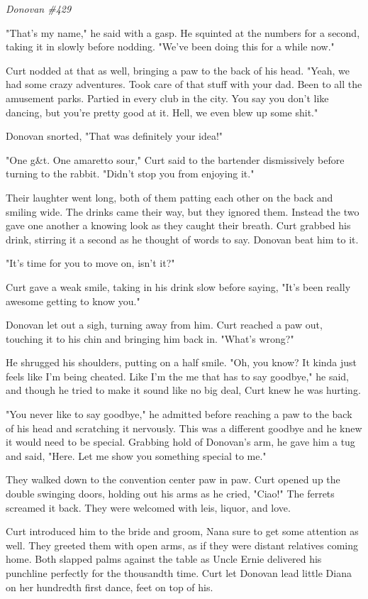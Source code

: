 \emph{Donovan \#429}

"That's my name," he said with a gasp. He squinted at the numbers for a second, taking it in slowly before nodding. "We've been doing this for a while now."

Curt nodded at that as well, bringing a paw to the back of his head. "Yeah, we had some crazy adventures. Took care of that stuff with your dad. Been to all the amusement parks. Partied in every club in the city. You say you don't like dancing, but you're pretty good at it. Hell, we even blew up some shit."

Donovan snorted, "That was definitely your idea!"

"One g\&t. One amaretto sour," Curt said to the bartender dismissively before turning to the rabbit. "Didn't stop you from enjoying it."

Their laughter went long, both of them patting each other on the back and smiling wide. The drinks came their way, but they ignored them. Instead the two gave one another a knowing look as they caught their breath. Curt grabbed his drink, stirring it a second as he thought of words to say. Donovan beat him to it.

"It's time for you to move on, isn't it?"

Curt gave a weak smile, taking in his drink slow before saying, "It's been really awesome getting to know you."

Donovan let out a sigh, turning away from him. Curt reached a paw out, touching it to his chin and bringing him back in. "What's wrong?"

He shrugged his shoulders, putting on a half smile. "Oh, you know? It kinda just feels like I'm being cheated. Like I'm the me that has to say goodbye," he said, and though he tried to make it sound like no big deal, Curt knew he was hurting.

"You never like to say goodbye," he admitted before reaching a paw to the back of his head and scratching it nervously. This was a different goodbye and he knew it would need to be special. Grabbing hold of Donovan's arm, he gave him a tug and said, "Here. Let me show you something special to me."

They walked down to the convention center paw in paw. Curt opened up the double swinging doors, holding out his arms as he cried, "Ciao!" The ferrets screamed it back. They were welcomed with leis, liquor, and love.

Curt introduced him to the bride and groom, Nana sure to get some attention as well. They greeted them with open arms, as if they were distant relatives coming home. Both slapped palms against the table as Uncle Ernie delivered his punchline perfectly for the thousandth time. Curt let Donovan lead little Diana on her hundredth first dance, feet on top of his.

